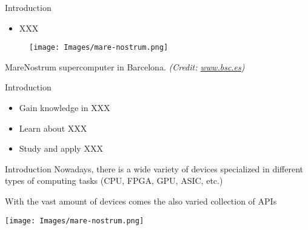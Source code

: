 \begin{frame}{Introduction}
\begin{center}
\begin{itemize}
  \item XXX
\end{itemize}
\endblock{}
\begin{figure}[H]
	\texttt{[image: Images/mare-nostrum.png]}
\end{figure}
MareNostrum supercomputer in Barcelona. \textit{(Credit: \url{www.bsc.es})}
\end{center}
\end{frame}
\begin{frame}{Introduction}
\begin{center}
\begin{itemize}
  \item Gain knowledge in XXX 
  \item Learn about XXX
  \item Study and apply XXX
\end{itemize}
\endblock{}
\end{center}
\end{frame}
\begin{frame}{Introduction}
  Nowadays, there is a wide variety of devices specialized in different types of computing tasks (CPU, FPGA, GPU, ASIC, etc.)
\begin{block}{}
With the vast amount of devices comes the also varied collection of APIs
\end{block}
\begin{center}
	\texttt{[image: Images/mare-nostrum.png]}
\end{center}
\end{frame}  
